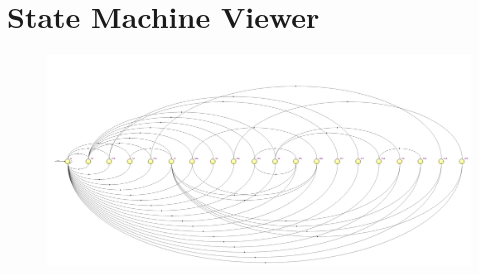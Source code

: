 \documentclass[11pt, fleqn]{article}
\begin{document}
\newpage
\section*{State Machine Viewer}
\vspace*{-0.5cm}
\begin{figure}
    \centering
    \includegraphics[scale=0.33]{FSM.png}
\end{figure}
\end{document}

